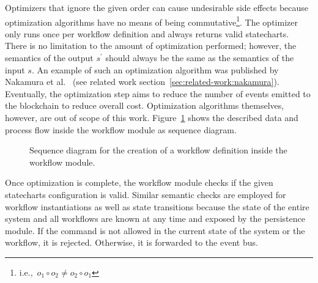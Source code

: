 Optimizers that ignore the given order can cause undesirable side effects because optimization algorithms have no means of being commutative\footnote{i.e.,\ $o_1 \circ o_2 \neq o_2 \circ o_1$}. The optimizer only runs once per workflow definition and always returns valid statecharts. There is no limitation to the amount of optimization performed; however, the semantics of the output $s^{\prime}$ should always be the same as the semantics of the input $s$. An example of such an optimization algorithm was published by Nakamura et al.~\cite{inter_organizational_bps_managed_by_blockchain} (see related work section~\ref{sec:related-work:nakamura}). Eventually, the optimization step aims to reduce the number of events emitted to the blockchain to reduce overall cost. Optimization algorithms themselves, however, are out of scope of this work. Figure~\ref{fig:ttsm:proposal:create_workflow} shows the described data and process flow inside the workflow module as sequence diagram.

\begin{figure}[h]
    \caption{Sequence diagram for the creation of a workflow definition inside the workflow module.}
    \label{fig:ttsm:proposal:create_workflow}
\end{figure}

Once optimization is complete, the workflow module checks if the given statecharts configuration is valid. Similar semantic checks are employed for workflow instantiations as well as state transitions because the state of the entire system and all workflows are known at any time and exposed by the persistence module. If the command is not allowed in the current state of the system or the workflow, it is rejected. Otherwise, it is forwarded to the event bus.


